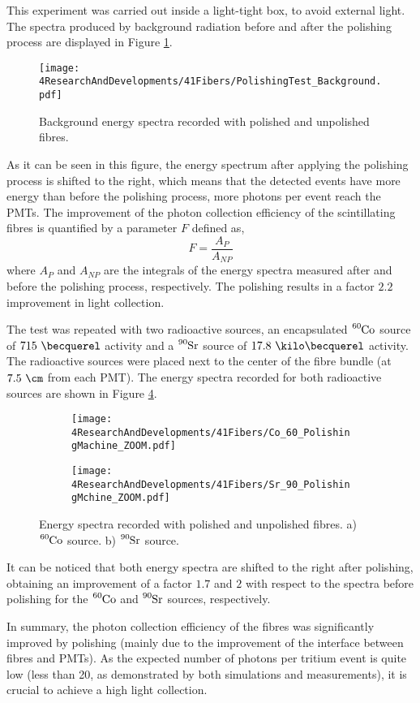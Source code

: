 This experiment was carried out inside a light-tight box, to avoid external light. The spectra produced by background radiation before and after the polishing process are displayed in Figure \ref{fig:ResultsOfPolishingMachineBackground}.
\begin{figure}[]
\centering
\texttt{[image: 4ResearchAndDevelopments/41Fibers/PolishingTest\_Background.pdf]}
\caption{Background energy spectra recorded with polished and unpolished fibres.\label{fig:ResultsOfPolishingMachineBackground}}
\end{figure}
As it can be seen in this figure, the energy spectrum after applying the polishing process is shifted to the right, which means that the detected events have more energy than before the polishing process, more photons per event reach the PMTs. The improvement of the photon collection efficiency of the scintillating fibres is quantified by a parameter $F$ defined as,
\begin{equation}
F=\frac{A_{P}}{A_{NP}}
\label{eq:RelativeImprovement}
\end{equation}
where $A_{P}$ and $A_{NP}$ are the integrals of the energy spectra measured after and before the polishing process, respectively. The polishing results in a factor $2.2$ improvement in light collection. 

The test was repeated with two radioactive sources, an encapsulated $\ce{^{60}Co}$ source of $715~\becquerel$ activity and a $\ce{^{90}Sr}$ source of $17.8~\kilo\becquerel$ activity. The radioactive sources were placed next to the center of the fibre bundle (at $7.5~\cm$ from each PMT). The energy spectra recorded for both radioactive sources are shown in Figure \ref{fig:ResultsOfPolishingMachineSources}.
\begin{figure}
\centering
    \begin{subfigure}[b]{1\textwidth}
    \centering
    \texttt{[image: 4ResearchAndDevelopments/41Fibers/Co\_60\_PolishingMachine\_ZOOM.pdf]}  
    \caption{\label{subfig:EnergySpectrumCo60PolishingTest}}
    \end{subfigure}
    \hfill
    \begin{subfigure}[b]{1\textwidth}
    \centering
    \texttt{[image: 4ResearchAndDevelopments/41Fibers/Sr\_90\_PolishingMchine\_ZOOM.pdf]}  
    \caption{\label{subfig:EnergySpectrumSr90PolishingTest}}
    \end{subfigure}
 \caption{Energy spectra recorded with polished and unpolished fibres. a) $\ce{^{60}Co}$ source. b) $\ce{^{90}Sr}$ source.}
 \label{fig:ResultsOfPolishingMachineSources}
\end{figure}
It can be noticed that both energy spectra are shifted to the right after polishing, obtaining an improvement of a factor $1.7$ and $2$ with respect to the spectra before polishing for the $\ce{^{60}Co}$ and $\ce{^{90}Sr}$ sources, respectively. 

In summary, the photon collection efficiency of the fibres was significantly improved by polishing (mainly due to the improvement of the interface between fibres and PMTs). As the expected number of photons per tritium event is quite low (less than 20, as demonstrated by both simulations and measurements), it is crucial to achieve a high light collection.